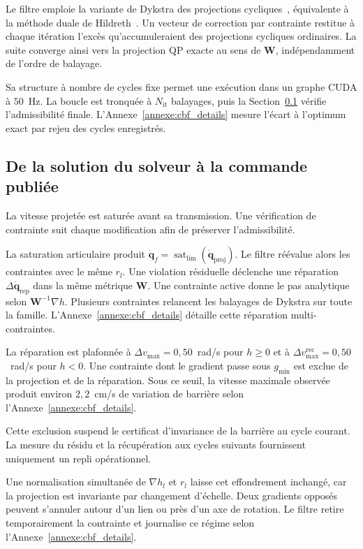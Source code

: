 Le filtre emploie la variante de Dykstra des projections cycliques~\cite{Dykstra1983Restricted,Boyle1986Method}, équivalente à la méthode duale de Hildreth~\cite{Hildreth1957Quadratic}. Un vecteur de correction par contrainte restitue à chaque itération l'excès qu'accumuleraient des projections cycliques ordinaires. La suite converge ainsi vers la projection QP exacte au sens de $\mathbf{W}$, indépendamment de l'ordre de balayage.

Sa structure à nombre de cycles fixe permet une exécution dans un graphe \ac{CUDA} à $50$~Hz. La boucle est tronquée à $N_{\mathrm{it}}$ balayages, puis la Section~\ref{subsec:commande} vérifie l'admissibilité finale. L'Annexe~\ref{annexe:cbf_details} mesure l'écart à l'optimum exact par rejeu des cycles enregistrés.

\subsection{De la solution du solveur à la commande publiée}\label{subsec:commande}
La vitesse projetée est saturée avant sa transmission. Une vérification de contrainte suit chaque modification afin de préserver l'admissibilité.

La saturation articulaire produit $\dot{\mathbf{q}}_{f} = \operatorname{sat}_{\mathrm{lim}}(\dot{\mathbf{q}}_{\mathrm{proj}})$. Le filtre réévalue alors les contraintes avec le même $r_l$. Une violation résiduelle déclenche une réparation $\Delta\dot{\mathbf{q}}_{\mathrm{rep}}$ dans la même métrique $\mathbf{W}$. Une contrainte active donne le pas analytique selon $\mathbf{W}^{-1}\nabla h$. Plusieurs contraintes relancent les balayages de Dykstra sur toute la famille. L'Annexe~\ref{annexe:cbf_details} détaille cette réparation multi-contraintes.


La réparation est plafonnée à $\Delta v_{\max}=0{,}50$~rad/s pour $h\geq0$ et à $\Delta v_{\max}^{\mathrm{rec}}=0{,}50$~rad/s pour $h<0$. Une contrainte dont le gradient passe sous $g_{\min}$ est exclue de la projection et de la réparation. Sous ce seuil, la vitesse maximale observée produit environ $2{,}2$~cm/s de variation de barrière selon l'Annexe~\ref{annexe:cbf_details}.

Cette exclusion suspend le certificat d'invariance de la barrière au cycle courant. La mesure du résidu et la récupération aux cycles suivants fournissent uniquement un repli opérationnel.

Une normalisation simultanée de $\nabla h_l$ et $r_l$ laisse cet effondrement inchangé, car la projection est invariante par changement d'échelle. Deux gradients opposés peuvent s'annuler autour d'un lien ou près d'un axe de rotation. Le filtre retire temporairement la contrainte et journalise ce régime selon l'Annexe~\ref{annexe:cbf_details}.

